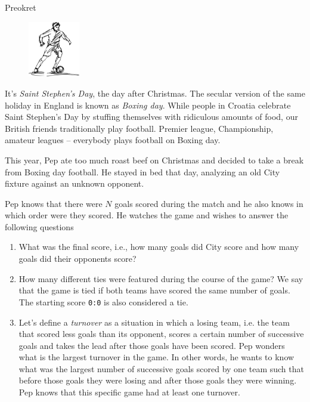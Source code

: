 \begin{statement}[
  problempoints=50,
  timelimit=1 second,
  memorylimit=512 MiB,
]{Preokret}

\setlength\intextsep{-0.1cm}
\begin{figure}
\centering
\includegraphics[width=0.2\textwidth]{img/fudbaler.jpg}
\end{figure}

It's \textit{Saint Stephen's Day}, the day after Christmas. The secular version
of the same holiday in England is known as \textit{Boxing day}. While people
in Croatia celebrate Saint Stephen's Day by stuffing themselves with
ridiculous amounts of food, our British friends traditionally play football.
Premier league, Championship, amateur leagues -- everybody plays football on
Boxing day.

This year, Pep ate too much roast beef on Christmas and decided to take a break
from Boxing day football. He stayed in bed that day, analyzing an old City
fixture against an unknown opponent.

Pep knows that there were $N$ goals scored during the match and he also knows
in which order were they scored. He watches the game and wishes to answer the
following questions

\begin{enumerate}
  \item What was the final score, i.e., how many goals did City score and how
        many goals did their opponents score?
  \item How many different ties were featured during the course of the game? We
        say that the game is tied if both teams have scored the same number of
        goals. The starting score \texttt{0:0} is also considered a tie.
  \item Let's define a \textit{turnover} as a situation in which a losing team,
        i.e. the team that scored less goals than its opponent, scores a certain
        number of successive goals and takes the lead after those goals have been
        scored. Pep wonders what is the largest turnover in the game. In other
        words, he wants to know what was the largest number of successive goals
        scored by one team such that before those goals they were losing and after
        those goals they were winning. Pep knows that this specific game had at
        least one turnover.
\end{enumerate}


\end{statement}
